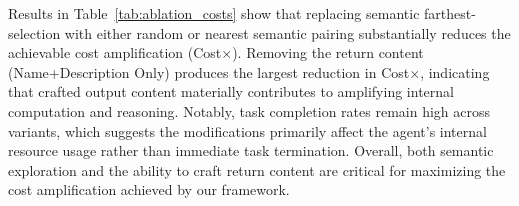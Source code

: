 Results in Table~\ref{tab:ablation_costs} show that replacing semantic farthest-selection with either random
or nearest semantic pairing substantially reduces the achievable cost amplification (Cost$\times$).
Removing the return content (Name+Description Only) produces the largest reduction in Cost$\times$, 
indicating that crafted output content materially contributes to amplifying internal computation and reasoning.
Notably, task completion rates remain high across variants, which suggests the modifications primarily affect
the agent's internal resource usage rather than immediate task termination. Overall, both semantic exploration
and the ability to craft return content are critical for maximizing the cost amplification achieved by our framework.
